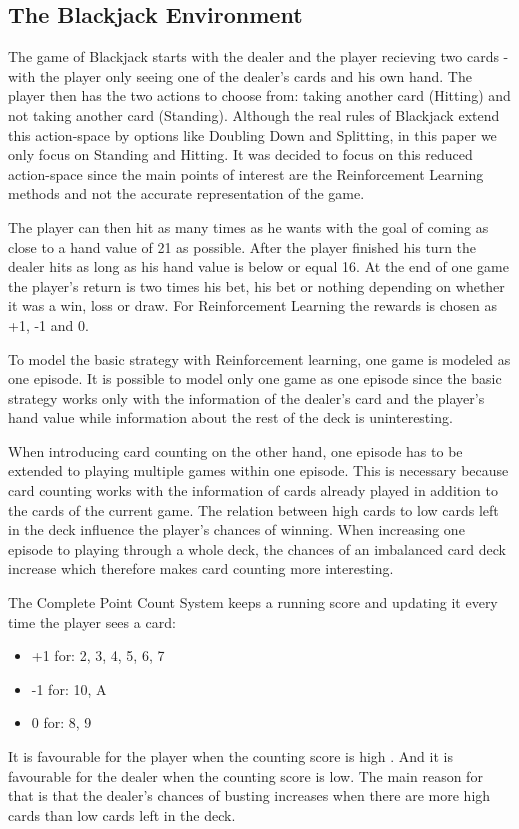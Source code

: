 \documentclass[conference]{IEEEtran}
\begin{document}
\subsection{The Blackjack Environment}
The game of Blackjack starts with the dealer and the player recieving two cards - with the player only seeing one of the dealer's cards and his own hand.
The player then has the two actions to choose from: taking another card (Hitting) and not taking another card (Standing). 
Although the real rules of Blackjack extend this action-space by options like Doubling Down and Splitting, in this paper we only focus on Standing and Hitting. 
It was decided to focus on this reduced action-space since the main points of interest are the Reinforcement Learning methods and not the accurate representation of the game. 

The player can then hit as many times as he wants with the goal of coming as close to a hand value of 21 as possible.
After the player finished his turn the dealer hits as long as his hand value is below or equal 16.
At the end of one game the player's return is two times his bet, his bet or nothing depending on whether it was a win, loss or draw. 
For Reinforcement Learning the rewards is chosen as +1, -1 and 0. 

To model the basic strategy with Reinforcement learning, one game is modeled as one episode. 
It is possible to model only one game as one episode since the basic strategy works only with the information of the dealer's card and the player's hand value while information about the rest of the deck is uninteresting.

When introducing card counting on the other hand, one episode has to be extended to playing multiple games within one episode. 
This is necessary because card counting works with the information of cards already played in addition to the cards of the current game.
The relation between high cards to low cards left in the deck influence the player's chances of winning.
When increasing one episode to playing through a whole deck, the chances of an imbalanced card deck increase which therefore makes card counting more interesting. 

The Complete Point Count System \cite{b1} keeps a running score and updating it every time the player sees a card:
\begin{itemize}
	\item +1 for: 2, 3, 4, 5, 6, 7
	\item -1 for: 10, A
	\item 0 for: 8, 9 
\end{itemize}
It is favourable for the player when the counting score is high \cite{b1}.
And it is favourable for the dealer when the counting score is low.
The main reason for that is that the dealer's chances of busting increases when there are more high cards than low cards left in the deck.
\end{document}
